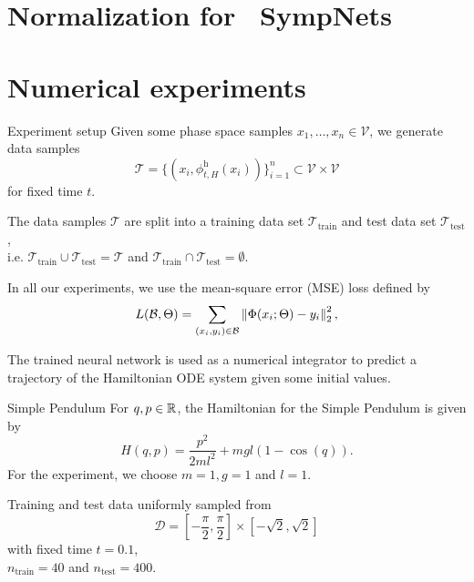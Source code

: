 \section{Normalization for ~\newline SympNets}

\section{Numerical experiments}

\begin{frame}{Experiment setup}
  Given some phase space samples $x_1, \dots, x_n \in \mathcal{V}$, we generate data samples 
  \begin{equation*}
    \mathcal{T} = \{ (x_i, \phi^{\text{h}}_{t,H}(x_i)) \}_{i=1}^{n}
    \subset \mathcal{V} \times \mathcal{V}
  \end{equation*}
  for fixed time $t$.

  \vspace{0.3cm}
  The data samples $\mathcal{T}$ are split into a training data set 
  $\mathcal{T}_{\text{train}}$ and test data set $\mathcal{T}_{\text{test}}$,\\
  i.e. $\mathcal{T}_{\text{train}} \cup \mathcal{T}_{\text{test}} = \mathcal{T}$
  and $\mathcal{T}_{\text{train}} \cap \mathcal{T}_{\text{test}} = \emptyset$.

  \vspace{0.6cm}
  In all our experiments, we use the mean-square error (MSE) loss defined by
  \begin{equation*}
    L(\mathcal{B}, \Theta) = \sum_{(x_i, y_i) \in \mathcal{B}} \left\lVert{\Phi(x_i; \Theta) - y_i}\right\rVert^2_2
    ,
  \end{equation*}

   The trained neural network is used as a numerical integrator
  to predict a trajectory of the Hamiltonian ODE system given some initial values.
\end{frame}

\begin{frame}[c]{Simple Pendulum}
  For $q,p \in \mathbb{R}$, the Hamiltonian for the Simple Pendulum is given by
  \begin{equation*}
    H(q,p) = \frac{p^2}{2ml^2} + mgl (1-\cos(q))
    .
  \end{equation*}
  For the experiment, we choose $m=1, g=1$ and $l=1$.

  \vspace{0.6cm}
  Training and test data uniformly sampled from
  \begin{equation*}
    \mathcal{D} = [-\frac{\pi}{2}, \frac{\pi}{2}] \times [-\sqrt{2}, \sqrt{2}]
  \end{equation*}
  with fixed time $t = 0.1$,\\
  $n_{\text{train}} = 40$ and $n_{\text{test}} = 400$.
\end{frame}

